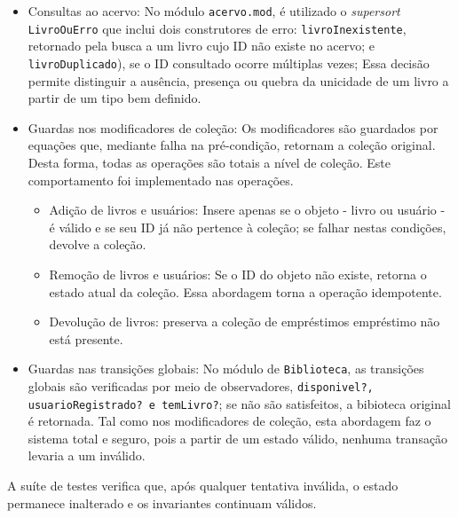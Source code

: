 \documentclass[a4paper,12pt]{article}
\begin{document}
\begin{itemize}
    \item Consultas ao acervo: No módulo \texttt{acervo.mod}, é utilizado o
          \textit{supersort} \texttt{LivroOuErro} que inclui dois construtores
          de erro: \texttt{livroInexistente}, retornado pela busca a um livro
          cujo ID não existe no acervo; e \texttt{livroDuplicado}), se o ID
          consultado ocorre múltiplas vezes; Essa decisão permite distinguir a
          ausência, presença ou quebra da unicidade de um livro a partir de um
          tipo bem definido.

    \item Guardas nos modificadores de coleção: Os modificadores são guardados
          por equações que, mediante falha na pré-condição, retornam a coleção
          original. Desta forma, todas as operações são totais a nível de
          coleção. Este comportamento foi implementado nas operações.
          \begin{itemize}
              \item Adição de livros e usuários: Insere apenas se o objeto -
                    livro ou usuário - é válido e se seu ID já não pertence à
                    coleção; se falhar nestas condições, devolve a coleção.

              \item Remoção de livros e usuários: Se o ID do objeto não existe,
                    retorna o estado atual da coleção. Essa abordagem torna a
                    operação idempotente.

              \item Devolução de livros: preserva a coleção de empréstimos
                    empréstimo não está presente.
          \end{itemize}

    \item Guardas nas transições globais: No módulo de \texttt{Biblioteca}, as
          transições globais são verificadas por meio de observadores,
          \texttt{disponivel?,\allowbreak{} usuarioRegistrado? e temLivro?}; se não são
          satisfeitos, a bibioteca original é retornada. Tal como nos
          modificadores de coleção, esta abordagem faz o sistema total e seguro,
          pois a partir de um estado válido, nenhuma transação levaria a um
          inválido.
\end{itemize}

A suíte de testes verifica que, após qualquer tentativa inválida, o estado
permanece inalterado e os invariantes continuam válidos.
\end{document}
